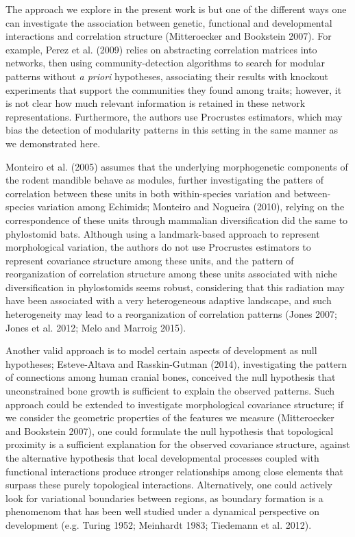 \documentclass[12pt,]{article}
\begin{document}
The approach we explore in the present work is but one of the different
ways one can investigate the association between genetic, functional and
developmental interactions and correlation structure (Mitteroecker and
Bookstein 2007). For example, Perez et al. (2009) relies on abstracting
correlation matrices into networks, then using community-detection
algorithms to search for modular patterns without \emph{a priori}
hypotheses, associating their results with knockout experiments that
support the communities they found among traits; however, it is not
clear how much relevant information is retained in these network
representations. Furthermore, the authors use Procrustes estimators,
which may bias the detection of modularity patterns in this setting in
the same manner as we demonstrated here.

Monteiro et al. (2005) assumes that the underlying morphogenetic
components of the rodent mandible behave as modules, further
investigating the patters of correlation between these units in both
within-species variation and between-species variation among Echimids;
Monteiro and Nogueira (2010), relying on the correspondence of these
units through mammalian diversification did the same to phylostomid
bats. Although using a landmark-based approach to represent
morphological variation, the authors do not use Procrustes estimators to
represent covariance structure among these units, and the pattern of
reorganization of correlation structure among these units associated
with niche diversification in phylostomids seems robust, considering
that this radiation may have been associated with a very heterogeneous
adaptive landscape, and such heterogeneity may lead to a reorganization
of correlation patterns (Jones 2007; Jones et al. 2012; Melo and Marroig
2015).

Another valid approach is to model certain aspects of development as
null hypotheses; Esteve-Altava and Rasskin-Gutman (2014), investigating
the pattern of connections among human cranial bones, conceived the null
hypothesis that unconstrained bone growth is sufficient to explain the
observed patterns. Such approach could be extended to investigate
morphological covariance structure; if we consider the geometric
properties of the features we measure (Mitteroecker and Bookstein 2007),
one could formulate the null hypothesis that topological proximity is a
sufficient explanation for the observed covariance structure, against
the alternative hypothesis that local developmental processes coupled
with functional interactions produce stronger relationships among close
elements that surpass these purely topological interactions.
Alternatively, one could actively look for variational boundaries
between regions, as boundary formation is a phenomenom that has been
well studied under a dynamical perspective on development (e.g. Turing
1952; Meinhardt 1983; Tiedemann et al. 2012).
\end{document}
